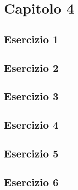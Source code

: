 \section{\textbf{Capitolo 4}}
\subsection{Esercizio 1}

\subsection{Esercizio 2}

\subsection{Esercizio 3}

\subsection{Esercizio 4}

\subsection{Esercizio 5}

\subsection{Esercizio 6}
